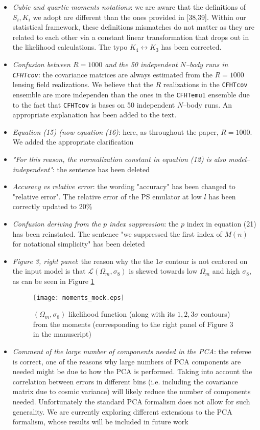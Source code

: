 \documentclass[11pt]{article}
\begin{document}
\begin{itemize}
\item \textit{Cubic and quartic moments notations}: we are aware that the definitions of $S_i,K_i$ we adopt are different than the ones provided in [38,39]. Within our statistical framework, these definitions mismatches do not matter as they are related to each other via a constant linear transformation that drops out in the likelihood calculations. The typo $K_4\leftrightarrow K_3$ has been corrected. 
\item \textit{Confusion between $R=1000$ and the 50 independent $N$--body runs in \texttt{CFHTcov}}: the covariance matrices are always estimated from the $R=1000$ lensing field realizations. We believe that the $R$ realizations in the \texttt{CFHTcov} ensemble are more independen than the ones in the \texttt{CFHTemu1} ensemble due to the fact that \texttt{CFHTcov} is bases on 50 independent $N$--body runs. An appropriate explanation has been added to the text. 
\item \textit{Equation (15) (now equation (16)}: here, as throughout the paper, $R=1000$. We added the appropriate clarification
\item \textit{"For this reason, the normalization constant in equation (12) is also model--independent"}: the sentence has been deleted
\item \textit{Accuracy vs relative error}: the wording "accuracy" has been changed to "relative error". The relative error of the PS emulator at low $l$ has been correctly updated to 20\%
\item \textit{Confusion deriving from the $p$ index suppression}: the $p$ index in equation (21) has been reinstated. The sentence "we suppressed the first index of $M(n)$ for notational simplicity" has been deleted  
\item \textit{Figure 3, right panel}: the reason why the the $1\sigma$ contour is not centered on the input model is that $\mathcal{L}(\Omega_m,\sigma_8)$ is skewed towards low $\Omega_m$ and high $\sigma_8$, as can be seen in Figure \ref{mock}
%
\begin{figure}
\begin{center}
\texttt{[image: moments\_mock.eps]}
\end{center}
\caption{$(\Omega_m,\sigma_8)$ likelihood function (along with its $1,2,3\sigma$ contours) from the moments (corresponding to the right panel of Figure 3 in the manuscript)}
\label{mock}
\end{figure}
%
\item \textit{Comment of the large number of components needed in the PCA}: the referee is correct, one of the reasons why large numbers of PCA components are needed might be due to how the PCA is performed. Taking into account the correlation between errors in different bins (i.e. including the covariance matrix due to cosmic variance) will likely reduce the number of components needed. Unfortunately the standard PCA formalism does not allow for such generality. We are currently exploring different extensions to the PCA formalism, whose results will be included in future work

\end{itemize}
\end{document}
